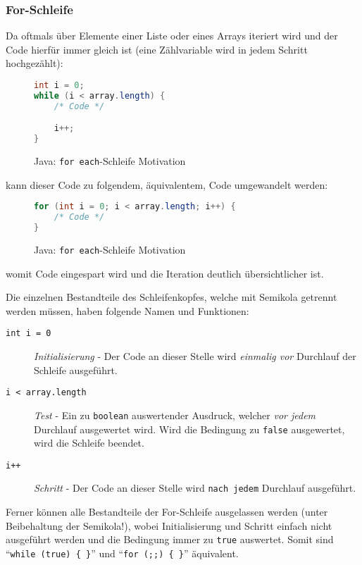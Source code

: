 	\subsubsection{For-Schleife}
		Da oftmals über Elemente einer Liste oder eines Arrays iteriert wird und der Code hierfür immer gleich ist (eine Zählvariable wird in jedem Schritt hochgezählt):
		\begin{figure}[H]
			\centering
			\begin{lstlisting}[language = Java]
int i = 0;
while (i < array.length) {
	/* Code */

	i++;
}
			\end{lstlisting}
			\caption{Java: \texttt{for each}-Schleife Motivation}
		\end{figure}
		kann dieser Code zu folgendem, äquivalentem, Code umgewandelt werden:
		\begin{figure}[H]
			\centering
			\begin{lstlisting}[language = Java]
for (int i = 0; i < array.length; i++) {
	/* Code */
}
			\end{lstlisting}
			\caption{Java: \texttt{for each}-Schleife Motivation}
		\end{figure}
		womit Code eingespart wird und die Iteration deutlich übersichtlicher ist.
		
		Die einzelnen Bestandteile des Schleifenkopfes, welche mit Semikola getrennt werden müssen, haben folgende Namen und Funktionen:
		\begin{description}
			\item[\texttt{int i = 0}] \textit{Initialisierung} - Der Code an dieser Stelle wird \textit{einmalig vor} Durchlauf der Schleife ausgeführt.
			\item[\texttt{i < array.length}] \textit{Test} - Ein zu \texttt{boolean} auswertender Ausdruck, welcher \textit{vor jedem} Durchlauf ausgewertet wird. Wird die Bedingung zu \texttt{false} ausgewertet, wird die Schleife beendet.
			\item[\texttt{i++}] \textit{Schritt} - Der Code an dieser Stelle wird \texttt{nach jedem} Durchlauf ausgeführt.
		\end{description}
		
		Ferner können alle Bestandteile der For-Schleife ausgelassen werden (unter Beibehaltung der Semikola!), wobei Initialisierung und Schritt einfach nicht ausgeführt werden und die Bedingung immer zu \texttt{true} auswertet. Somit sind \enquote{\texttt{while (true) \{ \}}} und \enquote{\texttt{for (;;) \{ \}}} äquivalent.
	
